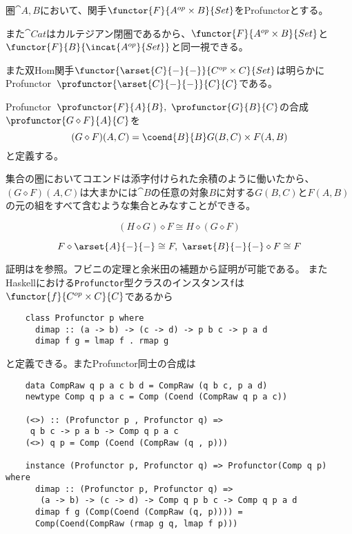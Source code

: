 \documentclass[uplatex,dvipdfmx]{jsarticle}
\newcommand{\pr}[1]{\colorbox[rgb]{0.9,0.9,0.9}{\lstinline{#1}}}
\begin{document}
  \begin{define}[Profunctor]
    圏$\cat{A,B}$において、関手$\functor{F}{A^{op}\times B}{Set}$をProfunctorとする。
    
    また$\cat{Cat}$はカルテジアン閉圏であるから、$\functor{F}{A^{op}\times B}{Set}$と$\functor{F}{B}{\incat{A^{op}}{Set}}$と同一視できる。
  \end{define}
  また双Hom関手$\functor{\arset{C}{-}{-}}{C^{op}\times C}{Set}$は明らかにProfunctor\ $\profunctor{\arset{C}{-}{-}}{C}{C}$である。
  \begin{define}[Profunctorの合成]
    Profunctor\ $\profunctor{F}{A}{B},\ \profunctor{G}{B}{C}$の合成
    $\profunctor{G\diamond F}{A}{C}$を
    \[(G\diamond F)(A,C) = \coend{B}{B} G(B, C)\times F(A, B)\]と定義する。
  \end{define}
  集合の圏においてコエンドは添字付けられた余積のように働いたから、$(G\diamond F)(A,C)$は大まかには$\cat{B}$の任意の対象$B$に対する$G(B,C)$と$F(A,B)$の元の組をすべて含むような集合とみなすことができる。
  \begin{prop}[Profunctorの結合律]
    \[(H\diamond G)\diamond F \cong H\diamond(G\diamond F)\]
  \end{prop}
  \begin{prop}[Profunctorの単位元律]
    \[F\diamond \arset{A}{-}{-} \cong F,\ \arset{B}{-}{-}\diamond F\cong F\]
  \end{prop}
  証明は\cite{coend_calculus}を参照。フビニの定理と余米田の補題から証明が可能である。
  またHaskellにおける\pr{Profunctor}型クラスのインスタンス\pr{f}は$\functor{f}{C^{op}\times C}{C}$であるから
  \begin{lstlisting}
    class Profunctor p where
      dimap :: (a -> b) -> (c -> d) -> p b c -> p a d
      dimap f g = lmap f . rmap g
  \end{lstlisting}
  と定義できる。またProfunctor同士の合成は
  \begin{lstlisting}
    data CompRaw q p a c b d = CompRaw (q b c, p a d)
    newtype Comp q p a c = Comp (Coend (CompRaw q p a c))

    (<>) :: (Profunctor p , Profunctor q) =>
     q b c -> p a b -> Comp q p a c
    (<>) q p = Comp (Coend (CompRaw (q , p)))

    instance (Profunctor p, Profunctor q) => Profunctor(Comp q p) where
      dimap :: (Profunctor p, Profunctor q) =>
       (a -> b) -> (c -> d) -> Comp q p b c -> Comp q p a d
      dimap f g (Comp(Coend (CompRaw (q, p)))) = 
      Comp(Coend(CompRaw (rmap g q, lmap f p)))
  \end{lstlisting}
  
\end{document}
